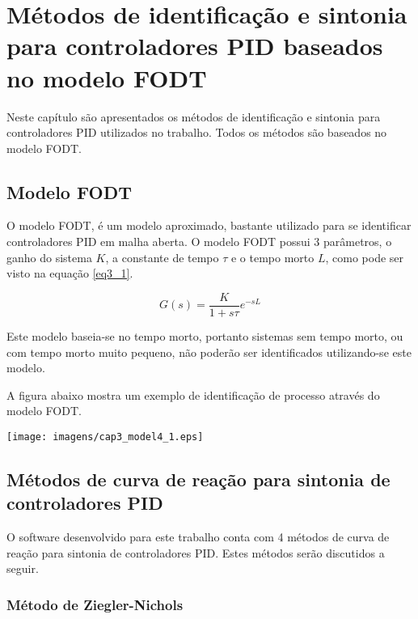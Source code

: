 \chapter{Métodos de identificação e sintonia para controladores PID
    baseados no modelo FODT \label{cap:metodos-de-identificacao-e-sintonia}}

Neste capítulo são apresentados os métodos de identificação e sintonia
para controladores PID utilizados no trabalho. Todos os métodos são
baseados no modelo FODT.

\section{Modelo FODT}

    O modelo \ac{FODT}, é um modelo aproximado, bastante utilizado para se
    identificar controladores \acs{PID} em malha aberta. O modelo \acs{FODT}
    possui 3 parâmetros, o ganho do sistema $K$, a constante de tempo $\tau$
    e o tempo morto $L$, como pode ser visto na equação \ref{eq3_1}.

    \begin{equation}
        G(s) = \frac{K}{1 + s\tau} e^{-sL}
        \label{eq3_1}
    \end{equation}

    Este modelo baseia-se no tempo morto, portanto sistemas sem tempo morto,
    ou com tempo morto muito pequeno, não poderão ser identificados utilizando-se
    este modelo.

    A figura abaixo mostra um exemplo de identificação de processo através
    do modelo \ac{FODT}.

    \begin{center}
        \texttt{[image: imagens/cap3\_model4\_1.eps]}
    \end{center}

\section{Métodos de curva de reação para sintonia de controladores PID}

    O software desenvolvido para este trabalho conta com 4 métodos de
    curva de reação para sintonia de controladores \acs{PID}. Estes métodos
    serão discutidos a seguir.
    
    \subsection{Método de Ziegler-Nichols}
        
